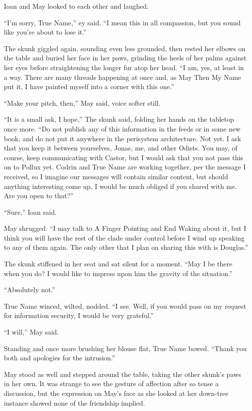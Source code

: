 Ioan and May looked to each other and laughed.

``I'm sorry, True Name,'' ey said. ``I mean this in all compassion, but you sound like you're about to lose it.''

The skunk giggled again, sounding even less grounded, then rested her elbows on the table and buried her face in her paws, grinding the heels of her palms against her eyes before straightening the longer fur atop her head. ``I am, yes, at least in a way. There are many threads happening at once and, as May Then My Name put it, I have painted myself into a corner with this one.''

``Make your pitch, then,'' May said, voice softer still.

``It is a small ask, I hope,'' The skunk said, folding her hands on the tabletop once more. ``Do not publish any of this information in the feeds or in some new book, and do not put it anywhere in the perisystem architecture. Not yet. I ask that you keep it between yourselves, Jonas, me, and other Odists. You may, of course, keep communicating with Castor, but I would ask that you not pass this on to Pollux yet. Codrin and True Name are working together, per the message I received, so I imagine our messages will contain similar content, but should anything interesting come up, I would be much obliged if you shared with me. Are you open to that?''

``Sure,'' Ioan said.

May shrugged. ``I may talk to A Finger Pointing and End Waking about it, but I think you will have the rest of the clade under control before I wind up speaking to any of them again. The only other that I plan on sharing this with is Douglas.''

The skunk stiffened in her seat and sat silent for a moment. ``May I be there when you do? I would like to impress upon him the gravity of the situation.''

``Absolutely not.''

True Name winced, wilted, nodded. ``I see. Well, if you would pass on my request for information security, I would be very grateful.''

``I will,'' May said.

Standing and once more brushing her blouse flat, True Name bowed. ``Thank you both and apologies for the intrusion.''

May stood as well and stepped around the table, taking the other skunk's paws in her own. It was strange to see the gesture of affection after so tense a discussion, but the expression on May's face as she looked at her down-tree instance showed none of the friendship implied.


